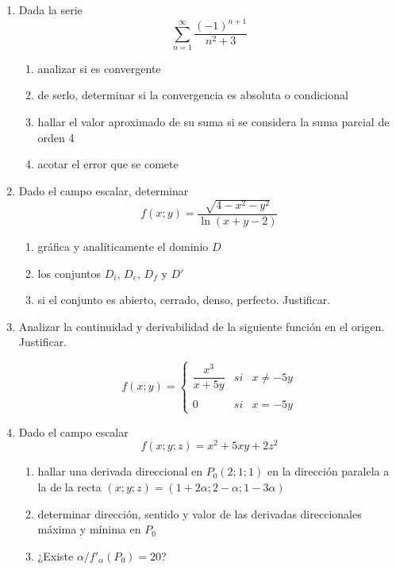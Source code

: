 \documentclass[9pt,a4paper]{extarticle}
\begin{document}
\newpage
{}

\begin{enumerate}
     \item Dada la serie 
    \[
    \sum_{n=1}^{\infty}\dfrac{(-1)^{n+1}}{n^2+3}
    \]
    \begin{enumerate}
    \item analizar si es convergente
    \item de serlo, determinar si la convergencia es absoluta o condicional
    \item hallar el valor aproximado de su suma si se considera la suma parcial de orden 4
    \item acotar el error que se comete
    \end{enumerate}
    
    
    \item Dado el campo escalar, determinar
    \[
    f(x;y)= \dfrac{\sqrt{4-x^2-y^2}}{\ln{(x+y-2)}}
    \]
    
    \begin{enumerate}
        \item gráfica y analíticamente el dominio $D$
        \item los conjuntos $D_i$, $D_e$, $D_f$ y $D'$
        \item si el conjunto es abierto, cerrado, denso, perfecto. Justificar.
    \end{enumerate}
    
    
    
    \item Analizar la continuidad y derivabilidad de la siguiente función en el origen. Justificar.
   
    \[
    f(x;y)= \left\{ \begin{array}{lcc}
             \dfrac{x^3}{x + 5y} &   si  & x \neq -5y \\
             \\ 0 &  si & x = -5y
             \end{array}
   \right.
    \]
    
    \item Dado el campo escalar \[ f(x;y;z)=x^2+5xy+2z^2 \] 
    \begin{enumerate}
         \item hallar una derivada direccional en $P_0 (2;1;1)$ en la dirección paralela a la de la recta $(x;y;z)=(1+2\alpha;2-\alpha;1-3\alpha)$
         \item determinar dirección, sentido y valor de las derivadas direccionales máxima y mínima en $P_0$
         \item ¿Existe $\alpha / {f'}_{\alpha}(P_0)=20$? 
    \end{enumerate}
    

\end{enumerate}
\end{document}
